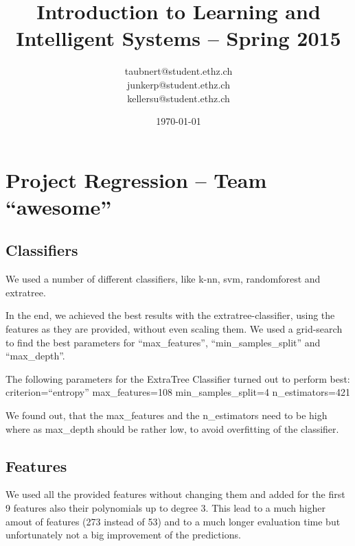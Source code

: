 \documentclass[a4paper, 11pt]{article}
\title{Introduction to Learning and Intelligent Systems -- Spring 2015}
\author{taubnert@student.ethz.ch\\ junkerp@student.ethz.ch\\ kellersu@student.ethz.ch\\}
\date{\today}
\begin{document}
\maketitle

\section{Project Regression -- Team ``awesome''}


\subsection{Classifiers}
We used a number of different classifiers, like k-nn, svm, randomforest and extratree.

In the end, we achieved the best results with the extratree-classifier, using the features as they are provided, without even scaling them.
We used a grid-search to find the best parameters for ``max\_features'', ``min\_samples\_split'' and ``max\_depth''.

The following parameters for the ExtraTree Classifier turned out to perform best:
criterion=``entropy''
max\_features=108
min\_samples\_split=4
n\_estimators=421


We found out, that the max\_features and the n\_estimators need to be high where as max\_depth should be rather low, to avoid overfitting of the classifier.


\subsection{Features}
We used all the provided features without changing them and added for the first 9 features also their polynomials up to degree 3.
This lead to a much higher amout of features (273 instead of 53) and to a much longer evaluation time but unfortunately not a big improvement of the predictions.
\end{document}
